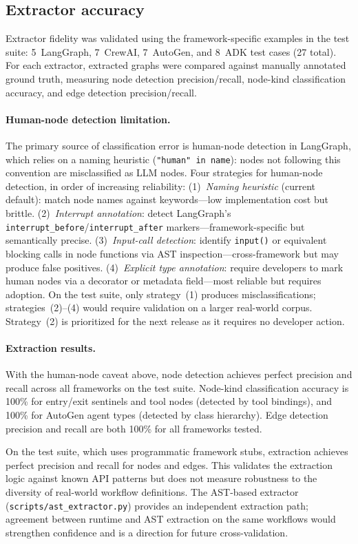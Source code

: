\subsection{Extractor accuracy}
\label{sec:accuracy}

Extractor fidelity was validated using the framework-specific examples
in the test suite: 5~LangGraph, 7~CrewAI, 7~AutoGen, and 8~ADK test
cases (27 total). For each extractor, extracted graphs were compared
against manually annotated ground truth, measuring node detection
precision/recall, node-kind classification accuracy, and edge detection
precision/recall.

\paragraph{Human-node detection limitation.}
The primary source of classification error is human-node detection in
LangGraph, which relies on a naming heuristic
(\texttt{"human" in name}): nodes not following this convention are
misclassified as LLM nodes. Four strategies for human-node
detection, in order of increasing reliability:
(1)~\emph{Naming heuristic} (current default): match node names against
keywords---low implementation cost but brittle.
(2)~\emph{Interrupt annotation}: detect LangGraph's
\texttt{interrupt\_before}/\texttt{interrupt\_after}
markers---framework-specific but semantically precise.
(3)~\emph{Input-call detection}: identify \texttt{input()} or
equivalent blocking calls in node functions via AST
inspection---cross-framework but may produce false positives.
(4)~\emph{Explicit type annotation}: require developers to mark human
nodes via a decorator or metadata field---most reliable but requires
adoption.
On the test suite, only strategy~(1) produces misclassifications;
strategies~(2)--(4) would require validation on a larger real-world
corpus. Strategy~(2) is prioritized for the next release as it requires
no developer action.

\paragraph{Extraction results.}
With the human-node caveat above, node detection achieves perfect
precision and recall across all frameworks on the test suite. Node-kind
classification accuracy is 100\% for entry/exit sentinels and tool nodes
(detected by tool bindings), and 100\% for AutoGen agent types (detected
by class hierarchy). Edge detection precision and recall are both
100\% for all frameworks tested.

On the test suite, which uses programmatic framework stubs, extraction
achieves perfect precision and recall for nodes and edges. This
validates the extraction logic against known API patterns but does not
measure robustness to the diversity of real-world workflow definitions.
The AST-based extractor (\texttt{scripts/ast\_extractor.py}) provides
an independent extraction path; agreement between runtime and AST
extraction on the same workflows would strengthen confidence and is a
direction for future cross-validation.
